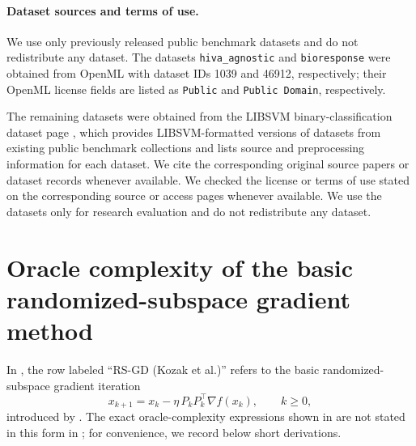 \documentclass[10pt]{article}
\begin{document}
\paragraph{Dataset sources and terms of use.}
We use only previously released public benchmark datasets and do not redistribute
any dataset. The datasets \texttt{hiva\_agnostic} and \texttt{bioresponse} were
obtained from OpenML \citep{vanschoren2013openml}
with dataset IDs 1039 and 46912, respectively; their
OpenML license fields are listed as \texttt{Public} and \texttt{Public Domain},
respectively. 

The remaining datasets were obtained from the LIBSVM binary-classification dataset page \citep{chang2011libsvm}, which
provides LIBSVM-formatted versions of datasets from existing public benchmark collections and
lists source and preprocessing information for each dataset. We cite the corresponding original source papers or dataset records whenever
available. We checked the license or terms of use stated on the corresponding
source or access pages whenever available. We use the datasets only for research
evaluation and do not redistribute any dataset.


\section{Oracle complexity of the basic randomized-subspace gradient method}
\label{app:kozak-rates}

In , the row labeled ``RS-GD (Kozak et al.)''
refers to the basic randomized-subspace gradient iteration
\begin{equation}
x_{k+1}=x_k-\eta\,P_kP_k^\top \nabla f(x_k),
\qquad k\ge 0,
\label{eq:kozak-basic-iter}
\end{equation}
introduced by \citet{kozak2021}.
The exact oracle-complexity expressions shown in
 are not stated in this form in
\citet{kozak2021}; for convenience, we record below short derivations.
\end{document}
